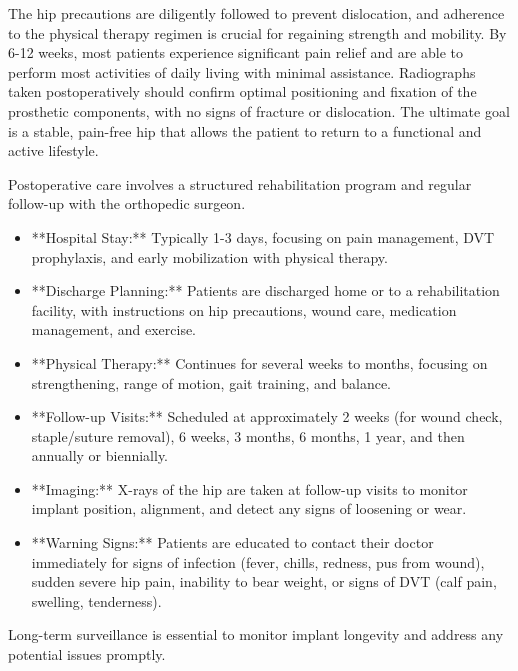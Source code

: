 The hip precautions are diligently followed to prevent dislocation, and adherence to the physical therapy regimen is crucial for regaining strength and mobility. By 6-12 weeks, most patients experience significant pain relief and are able to perform most activities of daily living with minimal assistance. Radiographs taken postoperatively should confirm optimal positioning and fixation of the prosthetic components, with no signs of fracture or dislocation. The ultimate goal is a stable, pain-free hip that allows the patient to return to a functional and active lifestyle.

Postoperative care involves a structured rehabilitation program and regular follow-up with the orthopedic surgeon.

\begin{itemize}
  \item **Hospital Stay:** Typically 1-3 days, focusing on pain management, DVT prophylaxis, and early mobilization with physical therapy.
  
  \item **Discharge Planning:** Patients are discharged home or to a rehabilitation facility, with instructions on hip precautions, wound care, medication management, and exercise.
  
  \item **Physical Therapy:** Continues for several weeks to months, focusing on strengthening, range of motion, gait training, and balance.
  
  \item **Follow-up Visits:** Scheduled at approximately 2 weeks (for wound check, staple/suture removal), 6 weeks, 3 months, 6 months, 1 year, and then annually or biennially.
  
  \item **Imaging:** X-rays of the hip are taken at follow-up visits to monitor implant position, alignment, and detect any signs of loosening or wear.
  
  \item **Warning Signs:** Patients are educated to contact their doctor immediately for signs of infection (fever, chills, redness, pus from wound), sudden severe hip pain, inability to bear weight, or signs of DVT (calf pain, swelling, tenderness).
\end{itemize}

Long-term surveillance is essential to monitor implant longevity and address any potential issues promptly.

